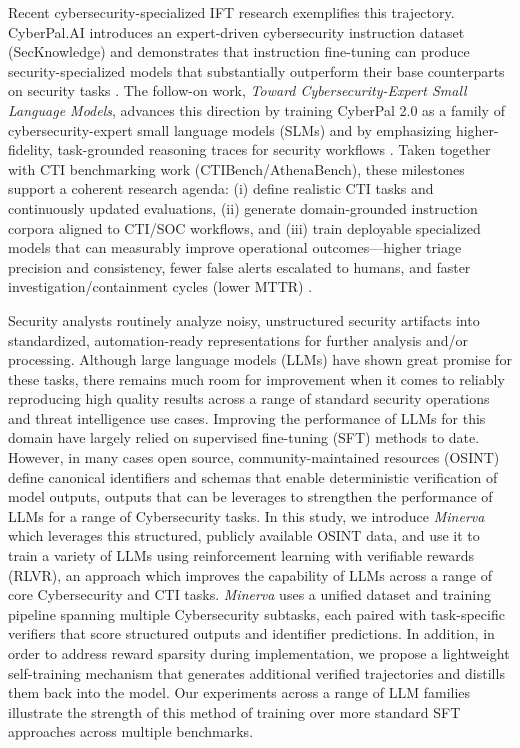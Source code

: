Recent cybersecurity-specialized IFT research exemplifies this trajectory. CyberPal.AI introduces an expert-driven cybersecurity instruction dataset (SecKnowledge) and demonstrates that instruction fine-tuning can produce security-specialized models that substantially outperform their base counterparts on security tasks \cite{levi2024cyberpal}. The follow-on work, \emph{Toward Cybersecurity-Expert Small Language Models}, advances this direction by training CyberPal 2.0 as a family of cybersecurity-expert small language models (SLMs) and by emphasizing higher-fidelity, task-grounded reasoning traces for security workflows \cite{levi2025cyberpal2}. Taken together with CTI benchmarking work (CTIBench/AthenaBench), these milestones support a coherent research agenda: (i) define realistic CTI tasks and continuously updated evaluations, (ii) generate domain-grounded instruction corpora aligned to CTI/SOC workflows, and (iii) train deployable specialized models that can measurably improve operational outcomes---higher triage precision and consistency, fewer false alerts escalated to humans, and faster investigation/containment cycles (lower MTTR) \cite{alam2025athenabench,gelman2023teq,levi2025cyberpal2}.




Security analysts routinely analyze noisy, unstructured security artifacts into standardized, automation-ready representations for further analysis and/or processing. Although large language models (LLMs) have shown great promise for these tasks, there remains much room for improvement when it comes to reliably reproducing high quality results across a range of standard security operations and threat intelligence use cases. Improving the performance of LLMs for this domain  have largely relied on supervised fine-tuning (SFT) methods to date. However, in many cases open source, community-maintained resources (OSINT) define canonical identifiers and schemas that enable deterministic verification of model outputs, outputs that can be leverages to strengthen the performance of LLMs for a range of Cybersecurity tasks. In this study, we introduce \textit{Minerva} which leverages this structured, publicly available OSINT data, and use it to train a variety of LLMs using reinforcement learning with verifiable rewards (RLVR), an approach which improves the capability of LLMs across a range of core Cybersecurity and CTI tasks. \textit{Minerva} uses a unified dataset and training pipeline spanning multiple Cybersecurity subtasks, each paired with task-specific verifiers that score structured outputs and identifier predictions. In addition, in order to address reward sparsity during implementation, we propose a lightweight self-training mechanism that generates additional verified trajectories and distills them back into the model. Our experiments across a range of LLM families illustrate the strength of this method of training over more standard SFT approaches across multiple benchmarks.
